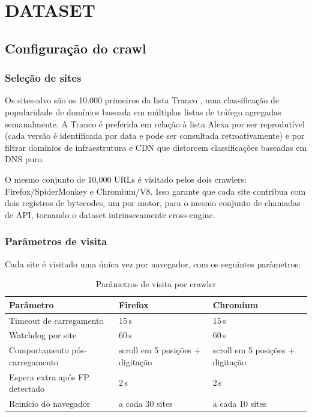 \chapter{DATASET}
\label{cap:dataset}

\section{Configuração do crawl}
\label{sec:crawl-config}

\subsection{Seleção de sites}
\label{sub:sitios}

Os sites-alvo são os 10.000 primeiros da lista Tranco \cite{lepochat2019}, uma
classificação de popularidade de domínios baseada em múltiplas listas de tráfego
agregadas semanalmente. A Tranco é preferida em relação à lista Alexa por ser
reprodutível (cada versão é identificada por data e pode ser consultada
retroativamente) e por filtrar domínios de infraestrutura e CDN que distorcem
classificações baseadas em DNS puro.

O mesmo conjunto de 10.000 URLs é visitado pelos dois crawlers:
Firefox/SpiderMonkey e Chromium/V8. Isso garante que cada site contribua com dois
registros de bytecodes, um por motor, para o mesmo conjunto de chamadas de
API, tornando o dataset intrinsecamente cross-engine.

\subsection{Parâmetros de visita}
\label{sub:params}

Cada site é visitado uma única vez por navegador, com os seguintes parâmetros:

\begin{table}[htb]
\centering
\caption{Parâmetros de visita por crawler}
\label{tab:params}
\begin{tabularx}{\linewidth}{lXX}
\toprule
\textbf{Parâmetro} & \textbf{Firefox} & \textbf{Chromium} \\
\midrule
Timeout de carregamento             & 15\,s & 15\,s \\
Watchdog por site                  & 60\,s & 60\,s \\
Comportamento pós-carregamento      & scroll em 5 posições + digitação & scroll em 5 posições + digitação \\
Espera extra após FP detectado      & 2\,s  & 2\,s \\
Reinício do navegador               & a cada 30 sites & a cada 10 sites \\
\bottomrule
\end{tabularx}
\end{table}

